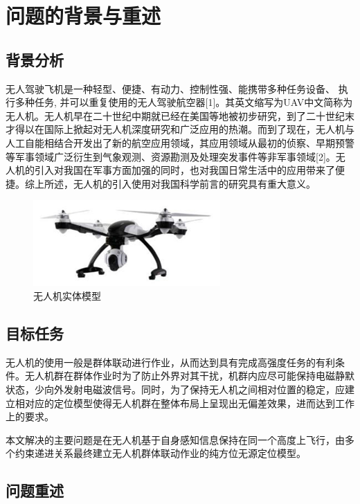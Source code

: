 %
%

\section{问题的背景与重述}

\subsection{背景分析}

无人驾驶飞机是一种轻型、便捷、有动力、控制性强、能携带多种任务设备、 执行多种任务, 并可以重复使用的无人驾驶航空器[1]。其英文缩写为UAV中文简称为无人机。无人机早在二十世纪中期就已经在美国等地被初步研究，到了二十世纪末才得以在国际上掀起对无人机深度研究和广泛应用的热潮。而到了现在，无人机与人工自能相结合开发出了新的航空应用领域，其应用领域从最初的侦察、早期预警等军事领域广泛衍生到气象观测、资源勘测及处理突发事件等非军事领域[2]。无人机的引入对我国在军事方面加强的同时，也对我国日常生活中的应用带来了便捷。综上所述，无人机的引入使用对我国科学前言的研究具有重大意义。

\begin{figure}[h]
    \centering
    \includegraphics[scale=0.7]{../res/droneModel.png}
    \caption{无人机实体模型}
\end{figure}

\subsection{目标任务}

无人机的使用一般是群体联动进行作业，从而达到具有完成高强度任务的有利条件。无人机群在群体作业时为了防止外界对其干扰，机群内应尽可能保持电磁静默状态，少向外发射电磁波信号。同时，为了保持无人机之间相对位置的稳定，应建立相对应的定位模型使得无人机群在整体布局上呈现出无偏差效果，进而达到工作上的要求。

本文解决的主要问题是在无人机基于自身感知信息保持在同一个高度上飞行，由多个约束递进关系最终建立无人机群体联动作业的纯方位无源定位模型。

\subsection{问题重述}

